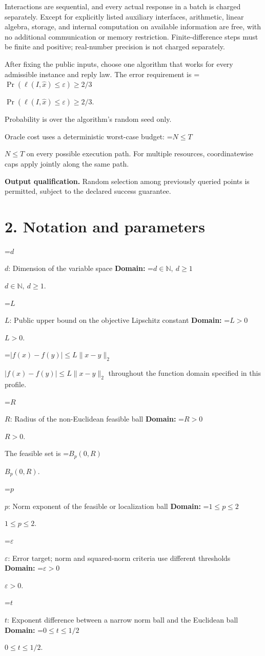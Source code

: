 \documentclass[10pt,a4paper]{article}
\newcommand{\AtlasMath}[1]{\par\begingroup\centering\setbox0=\hbox{$\displaystyle #1$}\ifdim\wd0>1.4\linewidth\typeout{ATLAS WIDE FORMULA: \the\wd0}\fi\ifdim\wd0>\linewidth\resizebox{\linewidth}{!}{\box0}\else\box0\fi\par\endgroup}
\newcommand{\AtlasInlineMath}[1]{\begingroup\setbox0=\hbox{$#1$}\ifdim\wd0>.4\linewidth\endgroup\AtlasMath{#1}\else\endgroup$#1$\fi}
\begin{document}
Interactions are sequential, and every actual response in a batch is charged separately. Except for explicitly listed auxiliary interfaces, arithmetic, linear algebra, storage, and internal computation on available information are free, with no additional communication or memory restriction. Finite-difference steps must be finite and positive; real-number precision is not charged separately.

After fixing the public inputs, choose one algorithm that works for every admissible instance and reply law. The error requirement is \AtlasInlineMath{\Pr(\ell(I,\widehat{x})\le \varepsilon)\ge2/3}.

Probability is over the algorithm's random seed only.

Oracle cost uses a deterministic worst-case budget: \AtlasInlineMath{N\le T} on every possible execution path. For multiple resources, coordinatewise caps apply jointly along the same path.

\textbf{Output qualification.} Random selection among previously queried points is permitted, subject to the declared success guarantee.

\section{2. Notation and parameters}
\AtlasInlineMath{d}: Dimension of the variable space \textbf{Domain:} \AtlasInlineMath{d\in\mathbb{N},\ d\ge1}.

\AtlasInlineMath{L}: Public upper bound on the objective Lipschitz constant \textbf{Domain:} \AtlasInlineMath{L>0}.

\AtlasInlineMath{|f(x)-f(y)|\le L\|x-y\|_2} throughout the function domain specified in this profile.

\AtlasInlineMath{R}: Radius of the non-Euclidean feasible ball \textbf{Domain:} \AtlasInlineMath{R>0}.

The feasible set is \AtlasInlineMath{B_p(0,R)}.

\AtlasInlineMath{p}: Norm exponent of the feasible or localization ball \textbf{Domain:} \AtlasInlineMath{1\le p\le2}.

\AtlasInlineMath{\varepsilon}: Error target; norm and squared-norm criteria use different thresholds \textbf{Domain:} \AtlasInlineMath{\varepsilon>0}.

\AtlasInlineMath{t}: Exponent difference between a narrow norm ball and the Euclidean ball \textbf{Domain:} \AtlasInlineMath{0\le t\le1/2}.
\end{document}
